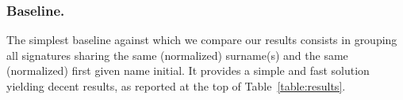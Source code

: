 \documentclass[runningheads,a4paper]{llncs}
\begin{document}

\subsubsection{Baseline.} The simplest baseline against which we compare our results
consists in grouping all signatures sharing the same (normalized) surname(s) and
the same (normalized) first given name initial. It provides a simple and fast
solution yielding decent results, as reported at the top of
Table~\ref{table:results}.
\end{document}
